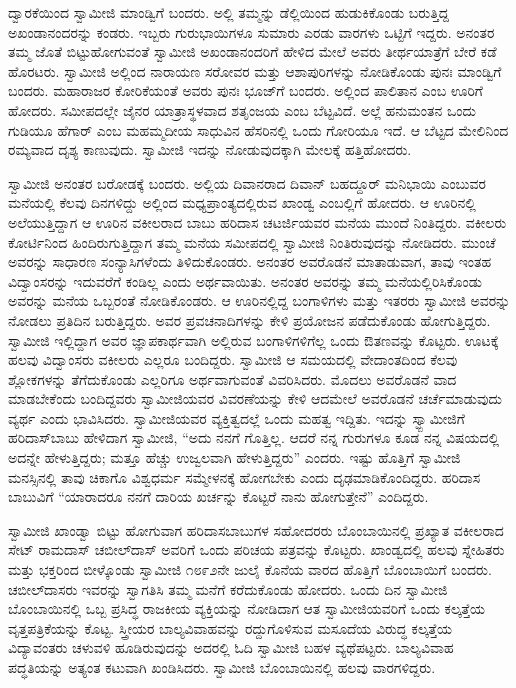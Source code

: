  ದ್ವಾರಕೆಯಿಂದ ಸ್ವಾಮೀಜಿ ಮಾಂಡ್ವಿಗೆ ಬಂದರು. ಅಲ್ಲಿ ತಮ್ಮನ್ನು ಡೆಲ್ಲಿಯಿಂದ ಹುಡುಕಿಕೊಂಡು ಬರುತ್ತಿದ್ದ ಅಖಂಡಾನಂದರನ್ನು ಕಂಡರು. ಇಬ್ಬರು ಗುರುಭಾಯಿಗಳೂ ಸುಮಾರು ಎರಡು ವಾರಗಳು ಒಟ್ಟಿಗೆ ಇದ್ದರು. ಅನಂತರ ತಮ್ಮ ಜೊತೆ ಬಿಟ್ಟುಹೋಗುವಂತೆ ಸ್ವಾಮೀಜಿ ಅಖಂಡಾನಂದರಿಗೆ ಹೇಳಿದ ಮೇಲೆ ಅವರು ತೀರ್ಥಯಾತ್ರೆಗೆ ಬೇರೆ ಕಡೆ ಹೊರಟರು. ಸ್ವಾಮೀಜಿ ಅಲ್ಲಿಂದ ನಾರಾಯಣ ಸರೋವರ ಮತ್ತು ಆಶಾಪುರಿಗಳನ್ನು ನೋಡಿಕೊಂಡು ಪುನಃ ಮಾಂಡ್ವಿಗೆ ಬಂದರು. ಮಹಾರಾಜರ ಕೋರಿಕೆಯಂತೆ ಅವರು ಪುನಃ ಭೂಜ್‍ಗೆ ಬಂದರು. ಅಲ್ಲಿಂದ ಪಾಲಿತಾನ ಎಂಬ ಊರಿಗೆ ಹೋದರು. ಸಮೀಪದಲ್ಲೇ ಜೈನರ ಯಾತ್ರಾಸ್ಥಳವಾದ ಶತೃಂಜಯ ಎಂಬ ಬೆಟ್ಟವಿದೆ. ಅಲ್ಲೆ ಹನುಮಂತನ ಒಂದು ಗುಡಿಯೂ ಹೆಗಾರ್ ಎಂಬ ಮಹಮ್ಮದೀಯ ಸಾಧುವಿನ ಹೆಸರಿನಲ್ಲಿ ಒಂದು ಗೋರಿಯೂ ಇದೆ. ಆ ಬೆಟ್ಟದ ಮೇಲಿನಿಂದ ರಮ್ಯವಾದ ದೃಶ್ಯ ಕಾಣುವುದು. ಸ್ವಾಮೀಜಿ ಇದನ್ನು ನೋಡುವುದಕ್ಕಾಗಿ ಮೇಲಕ್ಕೆ ಹತ್ತಿಹೋದರು. 

 ಸ್ವಾಮೀಜಿ ಅನಂತರ ಬರೋಡಕ್ಕೆ ಬಂದರು. ಅಲ್ಲಿಯ ದಿವಾನರಾದ ದಿವಾನ್ ಬಹದ್ದೂರ್ ಮನಿಭಾಯಿ ಎಂಬುವರ ಮನೆಯಲ್ಲಿ ಕೆಲವು ದಿನಗಳಿದ್ದು ಅಲ್ಲಿಂದ ಮಧ್ಯಪ್ರಾಂತ್ಯದಲ್ಲಿರುವ ಖಾಂಡ್ವ ಎಂಬಲ್ಲಿಗೆ ಹೋದರು. ಆ ಊರಿನಲ್ಲಿ ಅಲೆಯುತ್ತಿದ್ದಾಗ ಆ ಊರಿನ ವಕೀಲರಾದ ಬಾಬು ಹರಿದಾಸ ಚಟರ್ಜಿಯವರ ಮನೆಯ ಮುಂದೆ ನಿಂತಿದ್ದರು. ವಕೀಲರು ಕೋರ್ಟಿನಿಂದ ಹಿಂದಿರುಗುತ್ತಿದ್ದಾಗ ತಮ್ಮ ಮನೆಯ ಸಮೀಪದಲ್ಲಿ ಸ್ವಾಮೀಜಿ ನಿಂತಿರುವುದನ್ನು ನೋಡಿದರು. ಮುಂಚೆ ಅವರನ್ನು ಸಾಧಾರಣ ಸಂನ್ಯಾಸಿಗಳೆಂದು ತಿಳಿದುಕೊಂಡರು. ಅನಂತರ ಅವರೊಡನೆ ಮಾತಾಡುವಾಗ, ತಾವು ಇಂತಹ ವಿದ್ವಾಂಸರನ್ನು ಇದುವರೆಗೆ ಕಂಡಿಲ್ಲ ಎಂದು ಅರ್ಥವಾಯಿತು. ಅನಂತರ ಅವರನ್ನು ತಮ್ಮ ಮನೆಯಲ್ಲಿರಿಸಿಕೊಂಡು ಅವರನ್ನು ಮನೆಯ ಒಬ್ಬರಂತೆ ನೋಡಿಕೊಂಡರು. ಆ ಊರಿನಲ್ಲಿದ್ದ ಬಂಗಾಳಿಗಳು ಮತ್ತು ಇತರರು ಸ್ವಾಮೀಜಿ ಅವರನ್ನು ನೋಡಲು ಪ್ರತಿದಿನ ಬರುತ್ತಿದ್ದರು. ಅವರ ಪ್ರವಚನಾದಿಗಳನ್ನು ಕೇಳಿ ಪ್ರಯೋಜನ ಪಡೆದುಕೊಂಡು ಹೋಗುತ್ತಿದ್ದರು. ಸ್ವಾಮೀಜಿ ಇಲ್ಲಿದ್ದಾಗ ಅವರ ಜ್ಞಾಪಕಾರ್ಥವಾಗಿ ಅಲ್ಲಿರುವ ಬಂಗಾಳಿಗಳಿಗೆಲ್ಲ ಒಂದು ಔತಣವನ್ನು ಕೊಟ್ಟರು. ಊಟಕ್ಕೆ ಹಲವು ವಿದ್ವಾಂಸರು ವಕೀಲರು ಎಲ್ಲರೂ ಬಂದಿದ್ದರು. ಸ್ವಾಮೀಜಿ ಆ ಸಮಯದಲ್ಲಿ ವೇದಾಂತದಿಂದ ಕೆಲವು ಶ್ಲೋಕಗಳನ್ನು ತೆಗೆದುಕೊಂಡು ಎಲ್ಲರಿಗೂ ಅರ್ಥವಾಗುವಂತೆ ವಿವರಿಸಿದರು. ಮೊದಲು ಅವರೊಡನೆ ವಾದ ಮಾಡಬೇಕೆಂದು ಬಂದಿದ್ದವರು ಸ್ವಾಮೀಜಿಯವರ ವಿವರಣೆಯನ್ನು ಕೇಳಿ ಆದಮೇಲೆ ಅವರೊಡನೆ ಚರ್ಚೆಮಾಡುವುದು ವ್ಯರ್ಥ ಎಂದು ಭಾವಿಸಿದರು. ಸ್ವಾಮೀಜಿಯವರ ವ್ಯಕ್ತಿತ್ವದಲ್ಲೆ ಒಂದು ಮಹತ್ವ ಇದ್ದಿತು. ಇದನ್ನು ಸ್ವ್ಬಾಮೀಜಿಗೆ ಹರಿದಾಸ್‍ಬಾಬು ಹೇಳಿದಾಗ ಸ್ವಾಮೀಜಿ, “ಅದು ನನಗೆ ಗೊತ್ತಿಲ್ಲ. ಆದರೆ ನನ್ನ ಗುರುಗಳೂ ಕೂಡ ನನ್ನ ವಿಷಯದಲ್ಲಿ ಅದನ್ನೇ ಹೇಳುತ್ತಿದ್ದರು; ಮತ್ತೂ ಹೆಚ್ಚು ಉಜ್ವಲವಾಗಿ ಹೇಳುತ್ತಿದ್ದರು” ಎಂದರು. ಇಷ್ಟು ಹೊತ್ತಿಗೆ ಸ್ವಾಮೀಜಿ ಮನಸ್ಸಿನಲ್ಲಿ ತಾವು ಚಿಕಾಗೊ ವಿಶ್ವಧರ್ಮ ಸಮ್ಮೇಳನಕ್ಕೆ ಹೋಗಬೇಕು ಎಂದು ದೃಢಮಾಡಿಕೊಂದಿದ್ದರು. ಹರಿದಾಸ ಬಾಬುವಿಗೆ “ಯಾರಾದರೂ ನನಗೆ ದಾರಿಯ ಖರ್ಚನ್ನು ಕೊಟ್ಟರೆ ನಾನು ಹೋಗುತ್ತೇನೆ” ಎಂದಿದ್ದರು. 

ಸ್ವಾಮೀಜಿ ಖಾಂಡ್ವಾ ಬಿಟ್ಟು ಹೋಗುವಾಗ ಹರಿದಾಸಬಾಬುಗಳ ಸಹೋದರರು ಬೊಂಬಾಯಿನಲ್ಲಿ ಪ್ರಖ್ಯಾತ ವಕೀಲರಾದ ಸೇಟ್ ರಾಮದಾಸ್ ಚಬೀಲ್‍ದಾಸ್ ಅವರಿಗೆ ಒಂದು ಪರಿಚಯ ಪತ್ರವನ್ನು ಕೊಟ್ಟರು. ಖಾಂಡ್ವದಲ್ಲಿ ಹಲವು ಸ್ನೇಹಿತರು ಮತ್ತು ಭಕ್ತರಿಂದ ಬೀಳ್ಕೊಂಡು ಸ್ವಾಮೀಜಿ ೧೮೯೨ನೇ ಜುಲೈ ಕೊನೆಯ ವಾರದ ಹೊತ್ತಿಗೆ ಬೊಂಬಾಯಿಗೆ ಬಂದರು. ಚಬೀಲ್‍ದಾಸರು ಇವರನ್ನು ಸ್ವಾಗತಿಸಿ ತಮ್ಮ ಮನೆಗೆ ಕರೆದುಕೊಂಡು ಹೋದರು. ಒಂದು ದಿನ ಸ್ವಾಮೀಜಿ ಬೊಂಬಾಯಿನಲ್ಲಿ ಒಬ್ಬ ಪ್ರಸಿದ್ಧ ರಾಜಕೀಯ ವ್ಯಕ್ತಿಯನ್ನು ನೋಡಿದಾಗ ಆತ ಸ್ವಾಮೀಜಿಯವರಿಗೆ ಒಂದು ಕಲ್ಕತ್ತೆಯ ವೃತ್ತಪತ್ರಿಕೆಯನ್ನು ಕೊಟ್ಟ. ಸ್ತ್ರೀಯರ ಬಾಲ್ಯವಿವಾಹವನ್ನು ರದ್ದುಗೊಳಿಸುವ ಮಸೂದೆಯ ವಿರುದ್ಧ ಕಲ್ಕತ್ತೆಯ ವಿದ್ಯಾವಂತರು ಚಳುವಳಿ ಹೂಡಿರುವುದನ್ನು ಅದರಲ್ಲಿ ಓದಿ ಸ್ವಾಮೀಜಿ ಬಹಳ ವ್ಯಥೆಪಟ್ಟರು. ಬಾಲ್ಯವಿವಾಹ ಪದ್ಧತಿಯನ್ನು ಅತ್ಯಂತ ಕಟುವಾಗಿ ಖಂಡಿಸಿದರು. ಸ್ವಾಮೀಜಿ ಬೊಂಬಾಯಿನಲ್ಲಿ ಹಲವು ವಾರಗಳಿದ್ದರು.

